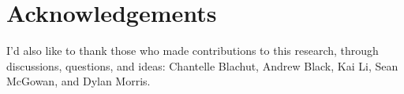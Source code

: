 \chapter{Acknowledgements}
\label{ch:acknowledgements}



I'd also like to thank those who made contributions to this research, through discussions, questions, and ideas: Chantelle Blachut, Andrew Black, Kai Li, Sean McGowan, and Dylan Morris.
